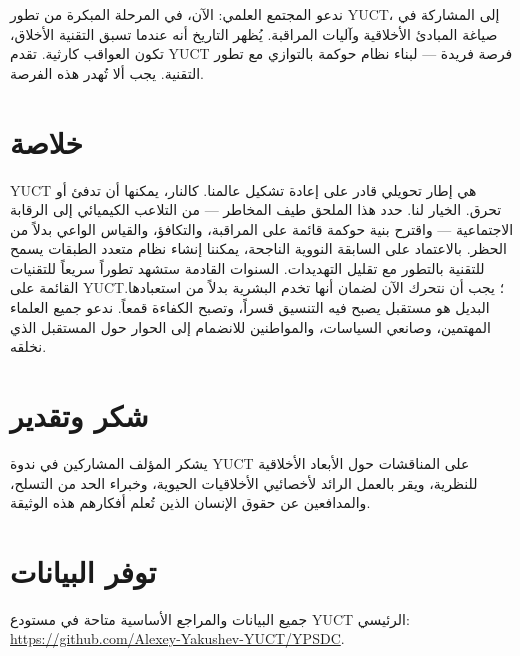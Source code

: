 \documentclass[12pt,a4paper]{article}
\theoremstyle{remark}
\begin{document}
	ندعو المجتمع العلمي: الآن، في المرحلة المبكرة من تطور YUCT، إلى المشاركة في صياغة المبادئ الأخلاقية وآليات المراقبة. يُظهر التاريخ أنه عندما تسبق التقنية الأخلاق، تكون العواقب كارثية. تقدم YUCT فرصة فريدة — لبناء نظام حوكمة بالتوازي مع تطور التقنية. يجب ألا تُهدر هذه الفرصة.
	
	\section{خلاصة}
	\label{sec:conclusion}
	
	YUCT هي إطار تحويلي قادر على إعادة تشكيل عالمنا. كالنار، يمكنها أن تدفئ أو تحرق. الخيار لنا. حدد هذا الملحق طيف المخاطر — من التلاعب الكيميائي إلى الرقابة الاجتماعية — واقترح بنية حوكمة قائمة على المراقبة، والتكافؤ، والقياس الواعي بدلاً من الحظر. بالاعتماد على السابقة النووية الناجحة، يمكننا إنشاء نظام متعدد الطبقات يسمح للتقنية بالتطور مع تقليل التهديدات. السنوات القادمة ستشهد تطوراً سريعاً للتقنيات القائمة على YUCT؛ يجب أن نتحرك الآن لضمان أنها تخدم البشرية بدلاً من استعبادها. البديل هو مستقبل يصبح فيه التنسيق قسراً، وتصبح الكفاءة قمعاً. ندعو جميع العلماء المهتمين، وصانعي السياسات، والمواطنين للانضمام إلى الحوار حول المستقبل الذي نخلقه.
	
	\section*{شكر وتقدير}
	يشكر المؤلف المشاركين في ندوة YUCT على المناقشات حول الأبعاد الأخلاقية للنظرية، ويقر بالعمل الرائد لأخصائيي الأخلاقيات الحيوية، وخبراء الحد من التسلح، والمدافعين عن حقوق الإنسان الذين تُعلم أفكارهم هذه الوثيقة.
	
	\section*{توفر البيانات}
	جميع البيانات والمراجع الأساسية متاحة في مستودع YUCT الرئيسي: \url{https://github.com/Alexey-Yakushev-YUCT/YPSDC}.
	
\end{document}
